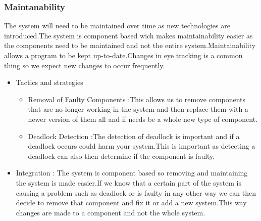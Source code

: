 \subsubsection{Maintanability}
\begin{flushleft}
The system will need to be maintained over time as new technologies are introduced.The system is component based wich makes maintainability easier as the components need to be maintained and not the entire system.Maintainability allows a program to be kept up-to-date.Changes in eye tracking is a common thing so we expect new changes to occur frequently.
\begin{itemize}
\item{Tactics and strategies}
\begin{itemize}
\item{Removal of Faulty Components} :This allows us to remove components that are no longer working in the system and then replace them with a newer version of them all and if needs be a whole new type of component.
\item{Deadlock Detection} :The detection of deadlock is important and if a deadlock occurs could harm your system.This is important as detecting a deadlock can also then determine if the component is faulty.
\end{itemize}

\item{Integration} :
The system is component based so removing and maintaining the system is made easier.If we know that a certain part of the system is causing a problem such as deadlock or is faulty in any other way we can then  decide to remove that component and fix it or add a new system.This way changes are made to a component and not the whole system.
\end{itemize}

\end{flushleft}
		
